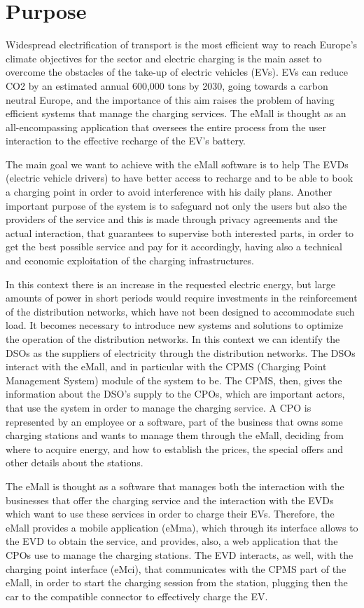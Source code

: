 \section{Purpose}
\label{sec:purpose}%
Widespread electrification of transport is the most efficient way to reach Europe’s climate objectives for the sector and electric charging is the main asset to overcome the obstacles of the take-up of electric vehicles (EVs). EVs can reduce CO2 by an estimated annual 600,000 tons by 2030, going towards a carbon neutral Europe, and the importance of this aim raises the problem of having efficient systems that manage the charging services. The eMall is thought as an all-encompassing application that oversees the entire process from the user interaction to the effective recharge of the EV's battery.

The main goal we want to achieve with the eMall software is to help The EVDs (electric vehicle drivers) to have better access to recharge and to be able to book a charging point in order to avoid interference with his daily plans. Another important purpose of the system is to safeguard not only the users but also the providers of the service and this is made through privacy agreements and the actual interaction, that guarantees to supervise both interested parts, in order to get the best possible service and pay for it accordingly, having also a technical and economic exploitation of the charging infrastructures.

In this context there is an increase in the requested electric energy, but large amounts of power in short periods would require investments in the reinforcement of the distribution networks, which have not been designed to accommodate such load. It becomes necessary to introduce new systems and solutions to optimize the operation of the distribution networks. In this context we can identify the DSOs as the suppliers of electricity through the distribution networks. The DSOs interact with the eMall, and in particular with the CPMS (Charging Point Management System) module of the system to be. The CPMS, then, gives the information about the DSO's supply to the CPOs, which are important actors, that use the system in order to manage the charging service. A CPO is represented by an employee or a software, part of the business that owns some charging stations and wants to manage them through the eMall, deciding from where to acquire energy, and how to establish the prices, the special offers and other details about the stations.

The eMall is thought as a software that manages both the interaction with the businesses that offer the charging service and the interaction with the EVDs which want to use these services in order to charge their EVs. Therefore, the eMall provides a mobile application (eMma), which through its interface allows to the EVD to obtain the service, and provides, also, a web application that the CPOs use to manage the charging stations. The EVD interacts, as well, with the charging point interface (eMci), that communicates with the CPMS part of the eMall, in order to start the charging session from the station, plugging then the car to the compatible connector to effectively charge the EV.

